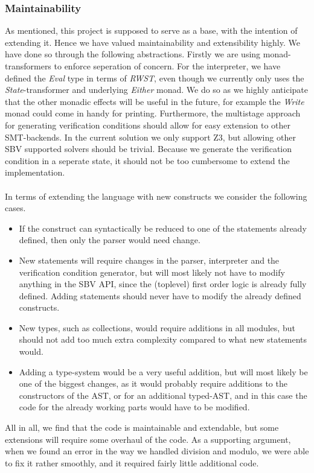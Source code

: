 \subsubsection{Maintainability}
As mentioned, this project is supposed to serve as a base, with the intention of extending it.
Hence we have valued maintainability and extensibility highly.
We have done so through the following abstractions.
Firstly we are using monad-transformers to enforce seperation of concern.
For the interpreter, we have defined the \textit{Eval} type in terms of \textit{RWST}, even though we currently only uses the \textit{State}-transformer and underlying \textit{Either} monad.
We do so as we highly anticipate that the other monadic effects will be useful in the future, for example the \textit{Write} monad could come in handy for printing.
Furthermore, the multistage approach for generating verification conditions should allow for easy extension to other SMT-backends.
In the current solution we only support Z3, but allowing other SBV supported solvers should be trivial.
Because we generate the verification condition in a seperate state, it should not be too cumbersome to extend the implementation.
\\~\\
In terms of extending the language with new constructs we consider the following cases.
\begin{itemize}
  \item If the construct can syntactically be reduced to one of the statements already defined, then only the parser would need change.
  \item New statements will require changes in the parser, interpreter and the verification condition generator, but will most likely not have to modify anything in the SBV API, since the (toplevel) first order logic is already fully defined.
  Adding statements should never have to modify the already defined constructs.
  \item New types, such as collections, would require additions in all modules, but should not add too much extra complexity compared to what new statements would.
  \item Adding a type-system would be a very useful addition, but will most likely be one of the biggest changes, as it would probably require additions to the constructors of the AST, or for an additional typed-AST, and in this case the code for the already working parts would have to be modified.
\end{itemize}
All in all, we find that the code is maintainable and extendable, but some extensions will require some overhaul of the code. 
As a supporting argument, when we found an error in the way we handled division and modulo, we were able to fix it rather smoothly, and it required fairly little additional code.


